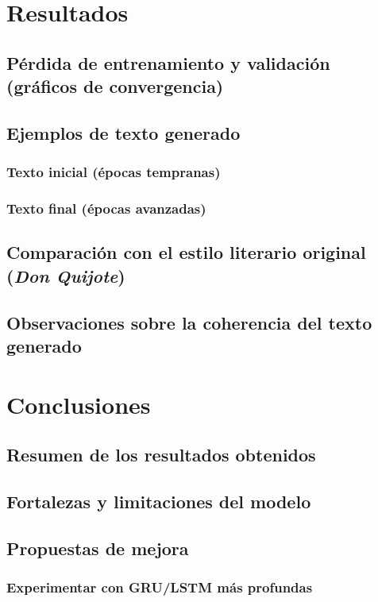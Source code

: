 \documentclass{article}
\begin{document}
\section{Resultados}
\subsection{Pérdida de entrenamiento y validación (gráficos de convergencia)}
\subsection{Ejemplos de texto generado}
\subsubsection{Texto inicial (épocas tempranas)}
\subsubsection{Texto final (épocas avanzadas)}
\subsection{Comparación con el estilo literario original (\textit{Don Quijote})}
\subsection{Observaciones sobre la coherencia del texto generado}

\newpage

\section{Conclusiones}
\subsection{Resumen de los resultados obtenidos}
\subsection{Fortalezas y limitaciones del modelo}
\subsection{Propuestas de mejora}
\subsubsection{Experimentar con GRU/LSTM más profundas}
\end{document}
